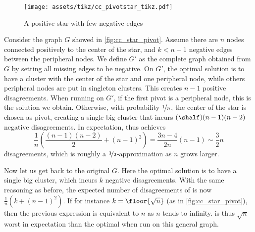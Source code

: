 \begin{aside}
\begin{figure}
  \centering
  \texttt{[image: assets/tikz/cc\_pivotstar\_tikz.pdf]}
  \caption{\small A positive star with few negative edges}
  \label{fig:cc_star_pivot}
\end{figure}
   Consider the graph $G$ showed in \autoref{fig:cc_star_pivot}. Assume there are $n$ nodes
   connected positively to the center of the star, and $k<n-1$ negative edges between the peripheral
   nodes. We define $G'$ as the complete graph obtained from $G$ by setting all missing edges to be
   negative. On $G'$, the optimal solution is to have a cluster with the center of the star and one
   peripheral node, while others peripheral nodes are put in singleton clusters. This creates $n-1$
   positive disagreements. When running \ccpivot{} on $G'$, if the first pivot is a peripheral node,
   this is the solution we obtain. Otherwise, with probability $\nicefrac{1}{n}$, the center of the
   star is chosen as pivot, creating a single big cluster that incurs $(\shalf)(n-1)(n-2)$ negative
   disagreements. In expectation, \ccpivot{} thus achieves \[
   \frac{1}{n}\left(\frac{(n-1)(n-2)}{2}+(n-1)^2\right)=\frac{3n-4}{2n}(n-1)\sim \frac{3}{2}n \]
   disagreements, which is roughly a $\nicefrac{3}{2}$-approximation as $n$ grows larger.

   Now let us get back to the original $G$. Here the optimal solution is to have a single big
   cluster, which incurs $k$ negative disagreements. With the same reasoning as before, the expected
   number of disagreements of \ccpivot{} is now $\frac{1}{n}\left(k+(n-1)^2\right)$. If for
   instance $k=\floor{\sqrt{n}}$ (as in \autoref{fig:cc_star_pivot}), then the previous expression
   is equivalent to $n$ as $n$ tends to infinity. \ccpivot{} is thus $\sqrt{n}$ worst in expectation
   than the optimal when run on this general graph.
\end{aside}
